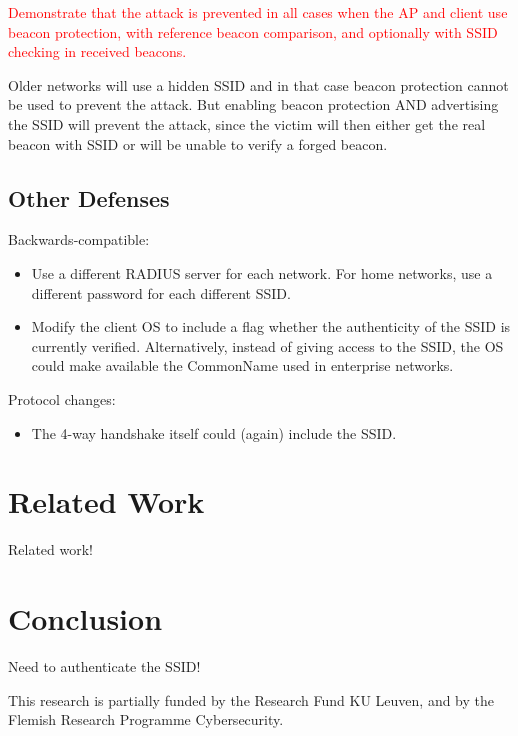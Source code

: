 \documentclass[sigconf,review]{acmart}
\DeclareRobustCommand{\red}[1]{\textcolor{red}{#1}}
\begin{document}
\red{Demonstrate that the attack is prevented in all cases when the AP and client use beacon protection, with reference beacon comparison, and optionally with SSID checking in received beacons.}

Older networks will use a hidden SSID and in that case beacon protection cannot be used to prevent the attack.
But enabling beacon protection AND advertising the SSID will prevent the attack, since the victim will then either get the real beacon with SSID or will be unable to verify a forged beacon.

\subsection{Other Defenses}

Backwards-compatible:
\begin{itemize}
	\item Use a different RADIUS server for each network.
	For home networks, use a different password for each different SSID.
	\item Modify the client OS to include a flag whether the authenticity of the SSID is currently verified.
	Alternatively, instead of giving access to the SSID, the OS could make available the CommonName used in enterprise networks.
\end{itemize}

Protocol changes:
\begin{itemize}
	\item The 4-way handshake itself could (again) include the SSID.
\end{itemize}


\section{Related Work}
\label{sec:relatedwork}

Related work!

\section{Conclusion}
\label{sec:conclusion}

Need to authenticate the SSID!

\begin{acks}
This research is partially funded by the Research Fund KU Leuven, and by the Flemish Research Programme Cybersecurity.
\end{acks}




\end{document}
